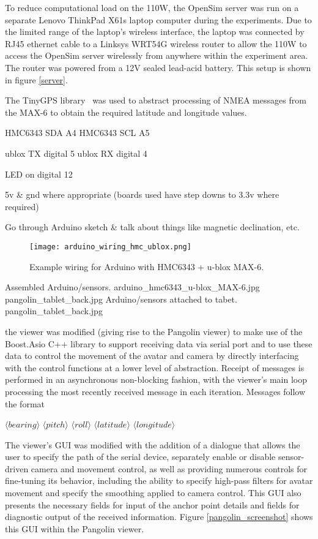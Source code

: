 To reduce computational load on the 110W, the OpenSim server was run on a separate Lenovo ThinkPad X61s laptop computer during the experiments. Due to the limited range of the laptop's wireless interface, the laptop was connected by RJ45 ethernet cable to a Linksys WRT54G wireless router to allow the 110W to access the OpenSim server wirelessly from anywhere within the experiment area. The router was powered from a 12V sealed lead-acid battery. This setup is shown in figure \ref{server}.



The TinyGPS library~\cite{Hart} was used to abstract processing of NMEA messages from the MAX-6 to obtain the required latitude and longitude values.

HMC6343 SDA A4
HMC6343 SCL A5

ublox TX digital 5
ublox RX digital 4

LED on digital 12

5v \& gnd where appropriate (boards used have step downs to 3.3v where required)

Go through Arduino sketch \& talk about things like magnetic declination, etc.

\begin{figure}[h]
\centering
  \texttt{[image: arduino\_wiring\_hmc\_ublox.png]}
  \caption{Example wiring for Arduino with HMC6343 + u-blox MAX-6.}
  \label{arduino_wiring_hmc_ublox.png}
\end{figure}

 {Assembled Arduino/sensors.} {arduino_hmc6343_u-blox_MAX-6.jpg}
       {pangolin_tablet_back.jpg} {Arduino/sensors attached to tabet.} {pangolin_tablet_back.jpg}

the viewer was modified (giving rise to the Pangolin viewer) to make use of the Boost.Asio C++ library to support receiving data via serial port and to use these data to control the movement of the avatar and camera by directly interfacing with the control functions at a lower level of abstraction. Receipt of messages is performed in an asynchronous non-blocking fashion, with the viewer's main loop processing the most recently received message in each iteration. Messages follow the format

$\langle bearing \rangle$ $\langle pitch \rangle$ $\langle roll \rangle$ $\langle latitude \rangle$ $\langle longitude \rangle$

The viewer's GUI was modified with the addition of a dialogue that allows the user to specify the path of the serial device, separately enable or disable sensor-driven camera and movement control, as well as providing numerous controls for fine-tuning its behavior, including the ability to specify high-pass filters for avatar movement and specify the smoothing applied to camera control. This GUI also presents the necessary fields for input of the anchor point details and fields for diagnostic output of the received information. Figure \ref{pangolin_screenshot} shows this GUI within the Pangolin viewer.


